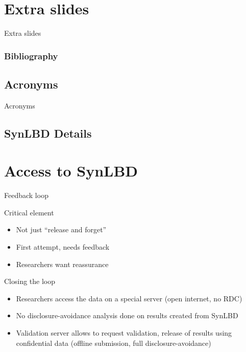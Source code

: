 
\section{Extra slides}

\begin{frame}
\begin{block}{Extra slides}

\end{block}
\end{frame}


\begin{frame}
\frametitle{Bibliography}
\tiny


\end{frame}

\subsection*{Acronyms}
\begin{frame}{Acronyms}



\end{frame}

\subsection{SynLBD Details}
\label{sec:SynLBD_details}

\section[Access]{Access to SynLBD}
\begin{frame}{Feedback loop}
\begin{block}{Critical element}
\begin{itemize}[<+->]
\item Not just ``release and forget''
\item First attempt, needs feedback 
\item Researchers want reassurance
\end{itemize}
\end{block}
\begin{block}{Closing the loop}
\begin{itemize}
\item Researchers access the data on a special server (open internet, no RDC)
\item No disclosure-avoidance analysis done on results created from SynLBD
\item Validation server allows to request validation, release of results using confidential data (offline submission, full disclosure-avoidance)
\end{itemize}
\end{block}
\end{frame}

